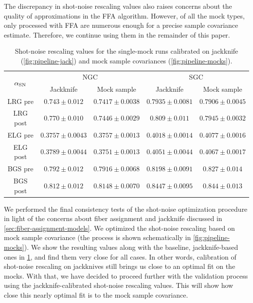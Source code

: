 The discrepancy in shot-noise rescaling values also raises concerns about the quality of approximations in the FFA algorithm.
However, of all the mock types, only \ezmocks{} processed with FFA are numerous enough for a precise sample covariance estimate.
Therefore, we continue using them in the remainder of this paper.

\begin{table}[tb!]
    \centering
    \begin{tabular}{|c|c|c|c|c|}
\hline
\multirow{2}{*}{$\alpha_{\rm SN}$} & \multicolumn{2}{|c|}{NGC} & \multicolumn{2}{|c|}{SGC} \\
\cline{2-5}
 & Jackknife & Mock sample & Jackknife & Mock sample \\
\hline
LRG pre & $0.743 \pm 0.012$ & $0.7417 \pm 0.0038$ & $0.7935 \pm 0.0081$ & $0.7906 \pm 0.0045$ \\
\hline
LRG post & $0.770 \pm 0.010$ & $0.7446 \pm 0.0029$ & $0.809 \pm 0.011$ & $0.7945 \pm 0.0032$ \\
\hline
ELG pre & $0.3757 \pm 0.0043$ & $0.3757 \pm 0.0013$ & $0.4018 \pm 0.0014$ & $0.4077 \pm 0.0016$ \\
\hline
ELG post & $0.3789 \pm 0.0044$ & $0.3751 \pm 0.0013$ & $0.4051 \pm 0.0044$ & $0.4067 \pm 0.0017$ \\
\hline
BGS pre & $0.792 \pm 0.012$ & $0.7916 \pm 0.0068$ & $0.8198 \pm 0.0091$ & $0.827 \pm 0.014$ \\
\hline
BGS post & $0.812 \pm 0.012$ & $0.8148 \pm 0.0070$ & $0.8447 \pm 0.0095$ & $0.844 \pm 0.013$ \\
\hline
    \end{tabular}
    \caption{Shot-noise rescaling values for the single-mock runs calibrated on jackknife (\cref{fig:pipeline-jack}) and mock sample covariances (\cref{fig:pipeline-mocks}).}
    \label{tab:shot-noise-rescaling-jack-mocks}
\end{table}

We performed the final consistency tests of the shot-noise optimization procedure in light of the concerns about fiber assignment and jackknife discussed in \cref{sec:fiber-assignment-models}.
We optimized the shot-noise rescaling based on mock sample covariance (the process is shown schematically in \cref{fig:pipeline-mocks}).
We show the resulting values along with the baseline, jackknife-based ones in \cref{tab:shot-noise-rescaling-jack-mocks}, and find them very close for all cases.
In other words, calibration of shot-noise rescaling on jackknives still brings us close to an optimal fit on the mocks.
With that, we have decided to proceed further with the validation process using the jackknife-calibrated shot-noise rescaling values.
This will show how close this nearly optimal fit is to the mock sample covariance.

